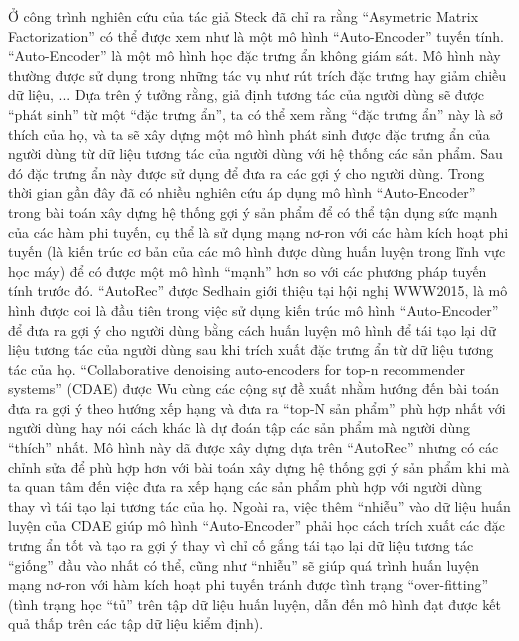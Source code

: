 Ở công trình nghiên cứu \cite{AMF} của tác giả Steck đã chỉ ra rằng ``Asymetric Matrix Factorization'' có thể được xem như là một mô hình ``Auto-Encoder'' tuyến tính.
``Auto-Encoder'' là một mô hình học đặc trưng ẩn không giám sát. Mô hình này thường được sử dụng trong những tác vụ như rút trích đặc trưng hay giảm chiều dữ liệu, ... 
Dựa trên ý tưởng rằng, giả định tương tác của người dùng sẽ được ``phát sinh'' từ một ``đặc trưng ẩn'', ta có thể xem rằng ``đặc trưng ẩn'' này là sở thích của họ, và ta sẽ xây dựng một mô hình phát sinh được đặc trưng ẩn của người dùng từ dữ liệu tương tác của người dùng với hệ thống các sản phẩm. Sau đó đặc trưng ẩn này được sử dụng để đưa ra các gợi ý cho người dùng.
Trong thời gian gần đây đã có nhiều nghiên cứu áp dụng mô hình ``Auto-Encoder'' trong bài toán xây dựng hệ thống gợi ý sản phẩm \cite{autorec,cdae,mvae} để có thể tận dụng sức mạnh của các hàm phi tuyến, cụ thể là sử dụng mạng nơ-ron với các hàm kích hoạt phi tuyến (là kiến trúc cơ bản của các mô hình được dùng huấn luyện trong lĩnh vực học máy) để có được một mô hình ``mạnh'' hơn so với các phương pháp tuyến tính trước đó.
``AutoRec'' \cite{autorec} được Sedhain giới thiệu tại hội nghị WWW2015, là mô hình được coi là đầu tiên trong việc sử dụng kiến trúc mô hình ``Auto-Encoder'' để đưa ra gợi ý cho người dùng bằng cách huấn luyện mô hình để tái tạo lại dữ liệu tương tác của người dùng sau khi trích xuất đặc trưng ẩn từ dữ liệu tương tác của họ. ``Collaborative denoising auto-encoders for top-n recommender systems'' \cite{cdae} (CDAE) được Wu cùng các cộng sự đề xuất nhằm hướng đến bài toán đưa ra gợi ý theo hướng xếp hạng và đưa ra ``top-N sản phẩm'' phù hợp nhất với người dùng hay nói cách khác là dự đoán tập các sản phẩm mà người dùng ``thích'' nhất. Mô hình này dã được xây dựng dựa trên ``AutoRec'' nhưng có các chỉnh sửa để phù hợp hơn với bài toán xây dựng hệ thống gợi ý sản phẩm khi mà ta quan tâm đến việc đưa ra xếp hạng các sản phẩm phù hợp với người dùng thay vì tái tạo lại tương tác của họ. 
Ngoài ra, việc thêm ``nhiễu'' vào dữ liệu huấn luyện của CDAE giúp mô hình ``Auto-Encoder'' phải học cách trích xuất các đặc trưng ẩn tốt và tạo ra gợi ý thay vì chỉ cố gắng tái tạo lại dữ liệu tương tác ``giống'' đầu vào nhất có thể, cũng như ``nhiễu'' sẽ giúp quá trình huấn luyện mạng nơ-ron với hàm kích hoạt phi tuyến tránh được tình trạng ``over-fitting'' (tình trạng học ``tủ'' trên tập dữ liệu huấn luyện, dẫn đến mô hình đạt được kết quả thấp trên các tập dữ liệu kiểm định).


